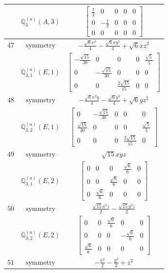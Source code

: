 \documentclass[fleqn,8pt,landscape]{jsarticle}
\begin{document}
\begin{longtable}{ccc}
$  $ & $ \mathbb{Q}_{3}^{(a)}(A,3) $ & $ \begin{bmatrix} \frac{1}{2} & 0 & 0 & 0 & 0 \\ 0 & - \frac{1}{2} & 0 & 0 & 0 \\ 0 & 0 & 0 & 0 & 0 \end{bmatrix} $ \\ \hline
$ 47 $ & $ \text{symmetry} $ & $ - \frac{\sqrt{6} x^{3}}{4} - \frac{\sqrt{6} x y^{2}}{4} + \sqrt{6} x z^{2} $ \\
$  $ & $ \mathbb{Q}_{3,1}^{(a)}(E,1) $ & $ \begin{bmatrix} - \frac{\sqrt{15}}{30} & 0 & 0 & 0 & \frac{\sqrt{5}}{5} \\ 0 & - \frac{\sqrt{15}}{30} & 0 & 0 & 0 \\ 0 & 0 & \frac{2 \sqrt{15}}{15} & 0 & 0 \end{bmatrix} $ \\ \hline
$ 48 $ & $ \text{symmetry} $ & $ - \frac{\sqrt{6} x^{2} y}{4} - \frac{\sqrt{6} y^{3}}{4} + \sqrt{6} y z^{2} $ \\
$  $ & $ \mathbb{Q}_{3,2}^{(a)}(E,1) $ & $ \begin{bmatrix} 0 & - \frac{\sqrt{15}}{30} & 0 & 0 & 0 \\ \frac{\sqrt{15}}{30} & 0 & 0 & 0 & \frac{\sqrt{5}}{5} \\ 0 & 0 & 0 & \frac{2 \sqrt{15}}{15} & 0 \end{bmatrix} $ \\ \hline
$ 49 $ & $ \text{symmetry} $ & $ \sqrt{15} x y z $ \\
$  $ & $ \mathbb{Q}_{3,1}^{(a)}(E,2) $ & $ \begin{bmatrix} 0 & 0 & 0 & \frac{\sqrt{6}}{6} & 0 \\ 0 & 0 & \frac{\sqrt{6}}{6} & 0 & 0 \\ 0 & \frac{\sqrt{6}}{6} & 0 & 0 & 0 \end{bmatrix} $ \\ \hline
$ 50 $ & $ \text{symmetry} $ & $ \frac{\sqrt{15} x^{2} z}{2} - \frac{\sqrt{15} y^{2} z}{2} $ \\
$  $ & $ \mathbb{Q}_{3,2}^{(a)}(E,2) $ & $ \begin{bmatrix} 0 & 0 & \frac{\sqrt{6}}{6} & 0 & 0 \\ 0 & 0 & 0 & - \frac{\sqrt{6}}{6} & 0 \\ \frac{\sqrt{6}}{6} & 0 & 0 & 0 & 0 \end{bmatrix} $ \\ \hline
$ 51 $ & $ \text{symmetry} $ & $ - \frac{x^{2}}{2} - \frac{y^{2}}{2} + z^{2} $ \\

\end{longtable}
\end{document}
